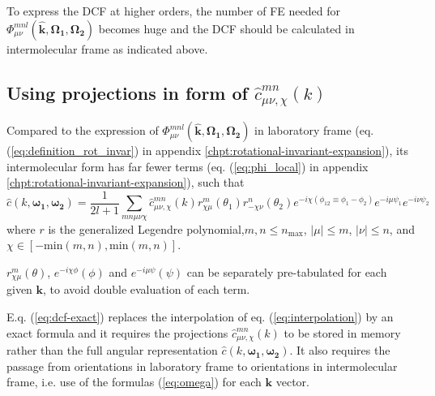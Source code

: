 To express the DCF at higher orders, the number of FE needed for $\Phi_{\mu\nu}^{mnl}(\mathbf{\hat{k}},\mathbf{\Omega_{1}},\mathbf{\Omega_{2}})$
becomes huge and the DCF should be calculated in intermolecular frame
as indicated above.


\subsection{Using projections in form of $\hat{c}_{\mu\nu,\chi}^{mn}(k)$\label{sub:Using-projections-in-1}}

Compared to the expression of $\Phi_{\mu\nu}^{mnl}(\mathbf{\hat{k}},\mathbf{\Omega_{1}},\mathbf{\Omega_{2}})$
in laboratory frame (eq. (\ref{eq:definition_rot_invar}) in appendix
\ref{chpt:rotational-invariant-expansion}), its intermolecular form
has far fewer terms (eq. (\ref{eq:phi_local}) in appendix \ref{chpt:rotational-invariant-expansion}),
such that
\begin{equation}
\hat{c}(k,\boldsymbol{\omega_{1}},\boldsymbol{\omega_{2}})=\frac{1}{2l+1}\sum_{mn\mu\nu\chi}\hat{c}_{\mu\nu,\chi}^{mn}(k)r_{\chi\mu}^{m}(\theta_{1})r_{-\chi\nu}^{n}(\theta_{2})e^{-i\chi(\phi_{12}\equiv\phi_{1}-\phi_{2})}e^{-i\mu\psi_{1}}e^{-i\nu\psi_{2}}\label{eq:dcf-exact}
\end{equation}
where $r$ is the generalized Legendre polynomial,$m,n\leq n{}_{\mathrm{max}}$,
$\left|\mu\right|\leq m$, $\left|\nu\right|\leq n$, and $\chi\in\left[-\mathrm{min}(m,n),\mathrm{min}(m,n)\right]$.

$r_{\chi\mu}^{m}(\theta)$, $e^{-i\chi\phi}(\phi)$ and $e^{-i\mu\psi}(\psi)$
can be separately pre-tabulated for each given $\mathbf{k}$, to avoid
double evaluation of each term.

E.q. (\ref{eq:dcf-exact}) replaces the interpolation of eq. (\ref{eq:interpolation})
by an exact formula and it requires the projections $\hat{c}_{\mu\nu,\chi}^{mn}(k)$
to be stored in memory rather than the full angular representation
$\hat{c}(k,\boldsymbol{\omega_{1}},\boldsymbol{\omega_{2}})$. It
also requires the passage from orientations in laboratory frame to
orientations in intermolecular frame, i.e. use of the formulas (\ref{eq:omega})
for each $\mathbf{k}$ vector.
